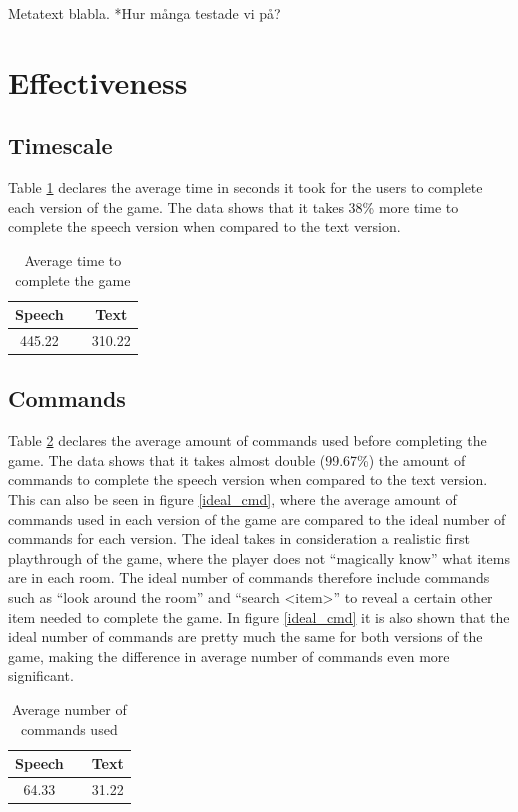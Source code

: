 Metatext blabla.
*Hur många testade vi på?

\section{Effectiveness}

\subsection{Timescale} %
Table \ref{avg_time} declares the average time in seconds it took for the users to complete each version of the game. The data shows that it takes 38\% more time to complete the speech version when compared to the text version.

\begin{table}[h!]
  \centering
  \begin{tabular}{ccc}
    \toprule
    Speech &   & Text\\
    \midrule
    445.22 &   & 310.22\\
    \bottomrule
  \end{tabular}
  \caption{Average time to complete the game}\label{avg_time}
\end{table}

\subsection{Commands} %
Table \ref{avg_cmd} declares the average amount of commands used before completing the game. The data shows that it takes almost double (99.67\%) the amount of commands to complete the speech version when compared to the text version. This can also be seen in figure \ref{ideal_cmd}, where the average amount of commands used in each version of the game are compared to the ideal number of commands for each version. The ideal takes in consideration a realistic first playthrough of the game, where the player does not ``magically know'' what items are in each room. The ideal number of commands therefore include commands such as ``look around the room'' and ``search <item>'' to reveal a certain other item needed to complete the game. In figure \ref{ideal_cmd} it is also shown that the ideal number of commands are pretty much the same for both versions of the game, making the difference in average number of commands even more significant.

\begin{table}[h!]
  \centering
  \begin{tabular}{ccc}
    \toprule
    Speech &   & Text\\
    \midrule
    64.33 &   & 31.22\\
    \bottomrule
  \end{tabular}
  \caption{Average number of commands used}\label{avg_cmd} %
\end{table}

